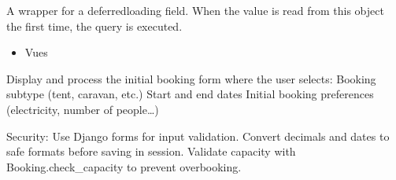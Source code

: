 \documentclass[letterpaper,10pt,french]{sphinxmanual}
\begin{document}
\begin{fulllineitems}
\begin{fulllineitems}
\label{\detokenize{index:bookings.models.SupplementMobileHomeTranslation.mobile_home_deposit}}
\pysigstartsignatures
\pysigline
{}
\pysigstopsignatures
\sphinxAtStartPar
A wrapper for a deferred\sphinxhyphen{}loading field. When the value is read from this
object the first time, the query is executed.

\end{fulllineitems}


\begin{fulllineitems}
\label{\detokenize{index:bookings.models.SupplementMobileHomeTranslation.objects}}
\pysigstartsignatures
\pysigline
{}
\pysigstopsignatures
\end{fulllineitems}


\end{fulllineitems}

\begin{itemize}
\item {} 
\sphinxAtStartPar
Vues

\end{itemize}
\label{\detokenize{index:module-bookings.views}}

\begin{fulllineitems}
\label{\detokenize{index:bookings.views.booking_form}}
\pysigstartsignatures
\pysiglinewithargsret
{}
{}
{}
\pysigstopsignatures
\sphinxAtStartPar
Display and process the initial booking form where the user selects:
\sphinxhyphen{} Booking subtype (tent, caravan, etc.)
\sphinxhyphen{} Start and end dates
\sphinxhyphen{} Initial booking preferences (electricity, number of people…)

\sphinxAtStartPar
Security:
\sphinxhyphen{} Use Django forms for input validation.
\sphinxhyphen{} Convert decimals and dates to safe formats before saving in session.
\sphinxhyphen{} Validate capacity with Booking.check\_capacity to prevent overbooking.

\end{fulllineitems}
\end{document}
